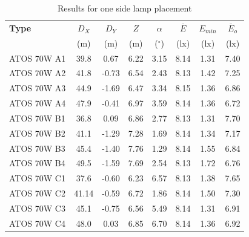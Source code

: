 \begin{table}[htb]
	\renewcommand{\arraystretch}{1.3}
	\caption{Results for one side lamp placement}
 	\label{tab:onesideLamps}
	\centering
  \begin{tabular}{ l | c | c | c | c | c | c | c }
    \hline
    \textbf{Type} & $D_X$ & $D_Y$ & $Z$ & $\alpha$ & $\overline{E}$ & $E_{min}$ & $\overline{E}_o$\\ 
    & (m) & (m) & (m) & ($^\circ$) & (lx) & (lx) & (lx)\\ \hline
    ATOS 70W A1 & 39.8 & 0.67 & 6.22 & 3.15 & 8.14 & 1.31 & 7.40\\ \hline
    ATOS 70W A2 & 41.8 & -0.73 & 6.54 & 2.43 & 8.13 & 1.42 & 7.25\\ \hline
    ATOS 70W A3 & 44.9 & -1.69 & 6.47 & 3.34 & 8.15 & 1.36 & 6.86\\ \hline
    ATOS 70W A4 & 47.9 & -0.41 & 6.97 & 3.59 & 8.14 & 1.36 & 6.72\\ \hline\hline
    ATOS 70W B1 & 36.8 & 0.09 & 6.86 & 2.77 & 8.13 & 1.31 & 7.70\\ \hline
    ATOS 70W B2 & 41.1 & -1.29 & 7.28 & 1.69 & 8.14 & 1.34 & 7.17\\ \hline
    ATOS 70W B3 & 45.4 & -1.40 & 7.76 & 1.29 & 8.14 & 1.55 & 6.84\\ \hline
    ATOS 70W B4 & 49.5 & -1.59 & 7.69 & 2.54 & 8.13 & 1.72 & 6.76\\ \hline\hline
    ATOS 70W C1 & 37.6 & -0.60 & 6.23 & 6.57 & 8.13 & 1.38 & 7.65\\ \hline
    ATOS 70W C2 & 41.14 & -0.59 & 6.72 & 1.86 & 8.14 & 1.50 & 7.30\\ \hline
    ATOS 70W C3 & 45.1 & -0.75 & 6.56 & 5.49 & 8.14 & 1.31 & 6.91\\ \hline
    ATOS 70W C4 & 48.0 & 0.03 & 6.85 & 6.70 & 8.14 & 1.36 & 6.92\\ \hline
  \end{tabular}
\end{table}

